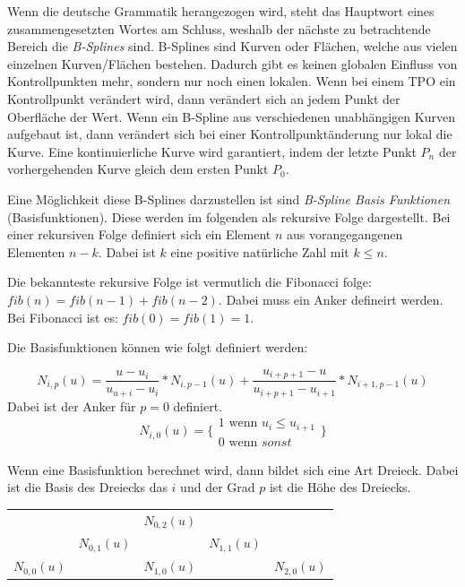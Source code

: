 \documentclass[11pt]{article}
\begin{document}
Wenn die deutsche Grammatik herangezogen wird, steht das Hauptwort eines zusammengesetzten Wortes am Schluss, weshalb der nächste zu betrachtende Bereich die \emph{B-Splines} sind. 
B-Splines sind Kurven oder Flächen, welche aus vielen einzelnen Kurven/Flächen bestehen. 
Dadurch gibt es keinen globalen Einfluss von Kontrollpunkten mehr, sondern nur noch einen lokalen. 
Wenn bei einem TPO ein Kontrollpunkt verändert wird, dann verändert sich an jedem Punkt der Oberfläche der Wert.
Wenn ein B-Spline aus verschiedenen unabhängigen Kurven aufgebaut ist, dann verändert sich bei einer Kontrollpunktänderung nur lokal die Kurve. 
Eine kontinuierliche Kurve wird garantiert, indem der letzte Punkt $P_{n}$ der vorhergehenden Kurve gleich dem ersten Punkt $P_{0}$. 

Eine Möglichkeit diese B-Splines darzustellen ist sind \emph{B-Spline Basis Funktionen} (Basisfunktionen). 
Diese werden im folgenden als rekursive Folge dargestellt.
Bei einer rekursiven Folge definiert sich ein Element $n$ aus vorangegangenen Elementen $n-k$.
Dabei ist $k$ eine positive natürliche Zahl mit $k \leq n$.

Die bekannteste rekursive Folge ist vermutlich die Fibonacci folge: $fib(n) = fib(n-1) + fib(n-2)$.
Dabei muss ein Anker defineirt werden.
Bei Fibonacci ist es: $fib(0) = fib(1) = 1$.

Die Basisfunktionen können wie folgt definiert werden:

\begin{equation}
N_{i,p}(u) = \frac{u-u_{i}}{u_{u+i}-u_{i}} * N_{i,p-1}(u) + \frac{u_{i+p+1} - u}{u_{i+p+1} - u_{i+1}} * N_{i+1,p-1}(u)
\end{equation}
Dabei ist der Anker für $p = 0$ definiert. 
\begin{equation}
N_{i,0}(u) = \Biggl\{ \substack{1 \text{ wenn } u_{i} \leq u_{i+1} \\ 0 \text{ wenn }sonst}\Biggr\}
\end{equation}

Wenn eine Basisfunktion berechnet wird, dann bildet sich eine Art Dreieck. 
Dabei ist die Basis des Dreiecks das $i$ und der Grad $p$ ist die Höhe des Dreiecks.

\begin{tabular}{c c c c c}
 &  & $N_{0,2}(u)$ &  &  \\
 & $N_{0,1}(u)$ &  & $N_{1,1}(u)$ &  \\
$N_{0,0}(u)$ &  & $N_{1,0}(u)$ &  & $N_{2,0}(u)$ \\
\end{tabular}
\end{document}

